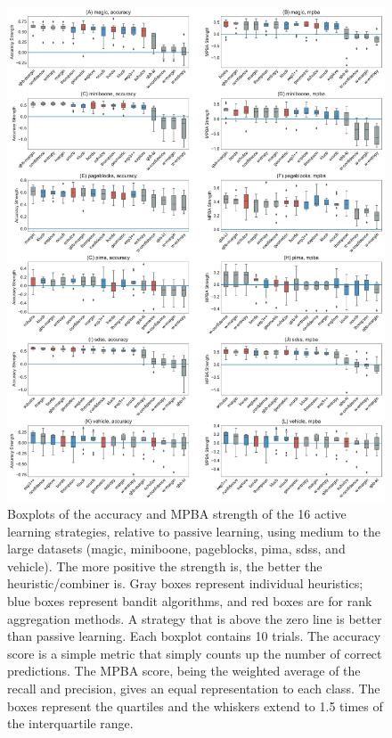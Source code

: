 \documentclass[fleqn,10pt,lineno]{wlpeerj} %
\begin{document}
\begin{figure}[tbp]
	\centering
	\includegraphics[width=\textwidth]{Fig7}
	\caption[Policy strength]{Boxplots of the accuracy and MPBA strength of the
	16 active learning strategies, relative to passive learning, using medium
	to the large datasets (magic, miniboone, pageblocks, pima, sdss, and
	vehicle). The more positive the strength is, the better the
	heuristic/combiner is. Gray boxes represent individual heuristics; blue
	boxes represent bandit algorithms, and red boxes are for rank aggregation
	methods. A strategy that is above the zero line is better than passive
	learning. Each boxplot contains 10 trials. The accuracy score is a simple
	metric that simply counts up the number of correct predictions. The MPBA
	score, being the weighted average of the recall and precision, gives an
	equal representation to each class. The boxes represent the quartiles and
	the whiskers extend to 1.5 times of the interquartile range.}
	\label{fig:strengths-large}
\end{figure}
\end{document}

